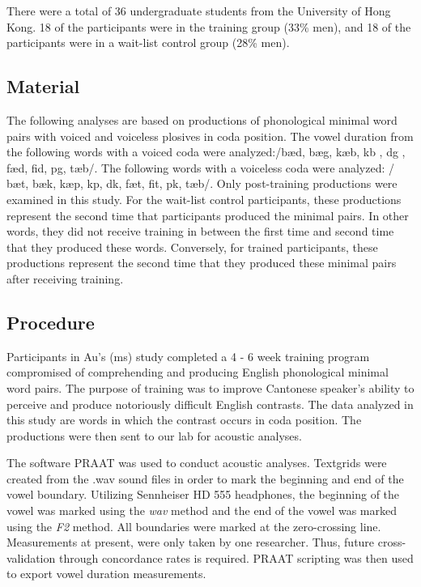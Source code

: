 \documentclass[man]{apa6}
\theoremstyle{definition}
\theoremstyle{definition}
\theoremstyle{definition}
\theoremstyle{remark}
\begin{document}
There were a total of 36 undergraduate students from the University of
Hong Kong. 18 of the participants were in the training group (33\% men),
and 18 of the participants were in a wait-list control group (28\% men).

\subsection{Material}\label{material}

The following analyses are based on productions of phonological minimal
word pairs with voiced and voiceless plosives in coda position. The
vowel duration from the following words with a voiced coda were
analyzed:/b\ae d, bæg, k\ae b, k\textturnv b , d\textopeno g , f\ae d,
fid, p\textsci g, t\ae b/. The following words with a voiceless coda
were analyzed: / b\ae t, b\ae k, k\ae p, k\textturnv p, d\textscripta k,
f\ae t, fit, p\textsci k, t\ae b/. Only post-training productions were
examined in this study. For the wait-list control participants, these
productions represent the second time that participants produced the
minimal pairs. In other words, they did not receive training in between
the first time and second time that they produced these words.
Conversely, for trained participants, these productions represent the
second time that they produced these minimal pairs after receiving
training.

\subsection{Procedure}\label{procedure}

Participants in Au's (ms) study completed a 4 - 6 week training program
compromised of comprehending and producing English phonological minimal
word pairs. The purpose of training was to improve Cantonese speaker's
ability to perceive and produce notoriously difficult English contrasts.
The data analyzed in this study are words in which the contrast occurs
in coda position. The productions were then sent to our lab for acoustic
analyses.

The software PRAAT was used to conduct acoustic analyses. Textgrids were
created from the .wav sound files in order to mark the beginning and end
of the vowel boundary. Utilizing Sennheiser HD 555 headphones, the
beginning of the vowel was marked using the \emph{wav} method and the
end of the vowel was marked using the \emph{F2} method. All boundaries
were marked at the zero-crossing line. Measurements at present, were
only taken by one researcher. Thus, future cross-validation through
concordance rates is required. PRAAT scripting was then used to export
vowel duration measurements.
\end{document}
